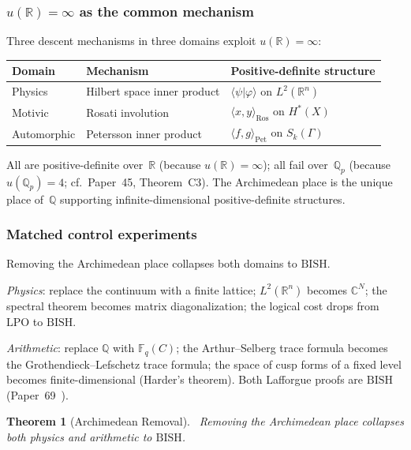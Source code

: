 \documentclass[11pt]{article}
\newtheorem{theorem}{Theorem}[section]
\theoremstyle{definition}
\theoremstyle{remark}
\newcommand{\leanok}{\textsf{\small \textcolor{green!70!black}{\checkmark}}}
\newcommand{\Q}{\mathbb{Q}}
\newcommand{\R}{\mathbb{R}}
\newcommand{\C}{\mathbb{C}}
\newcommand{\Fq}{\mathbb{F}_q}
\newcommand{\Qp}{\Q_p}
\newcommand{\BISH}{\mathrm{BISH}}
\newcommand{\LPO}{\mathrm{LPO}}
\begin{document}
\subsubsection{$u(\R) = \infty$ as the common mechanism}

Three descent mechanisms in three domains exploit $u(\R) = \infty$:

\begin{center}
\begin{tabular}{lll}
\toprule
\textbf{Domain} & \textbf{Mechanism} & \textbf{Positive-definite structure} \\
\midrule
Physics & Hilbert space inner product & $\langle \psi | \varphi \rangle$ on $L^2(\R^n)$ \\
Motivic & Rosati involution & $\langle x, y \rangle_{\mathrm{Ros}}$ on $H^*(X)$ \\
Automorphic & Petersson inner product & $\langle f, g \rangle_{\mathrm{Pet}}$ on $S_k(\Gamma)$ \\
\bottomrule
\end{tabular}
\end{center}

\noindent All are positive-definite over~$\R$ (because $u(\R) = \infty$); all fail over~$\Qp$ (because $u(\Qp) = 4$; cf.\ Paper~45, Theorem~C3). The Archimedean place is the unique place of~$\Q$ supporting infinite-dimensional positive-definite structures.

\subsubsection{Matched control experiments}

Removing the Archimedean place collapses both domains to $\BISH$.

\emph{Physics}: replace the continuum with a finite lattice; $L^2(\R^n)$ becomes $\C^N$; the spectral theorem becomes matrix diagonalization; the logical cost drops from $\LPO$ to $\BISH$.

\emph{Arithmetic}: replace $\Q$ with $\Fq(C)$; the Arthur--Selberg trace formula becomes the Grothendieck--Lefschetz trace formula; the space of cusp forms of a fixed level becomes finite-dimensional (Harder's theorem). Both Lafforgue proofs are $\BISH$ (Paper~69~\cite{Paper69}).

\begin{theorem}[Archimedean Removal]
\label{thm:removal}
\leanok\ Removing the Archimedean place collapses both physics and arithmetic to $\BISH$.
\end{theorem}
\end{document}
